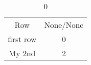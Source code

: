\begin{table}
	\caption{0}
	\label{tab:test}
	\begin{tabular}{cc}
		Row	&	None/None	\\
		first row	&	0	\\
		My 2nd	&	2	\\
	\end{tabular}
\end{table}
